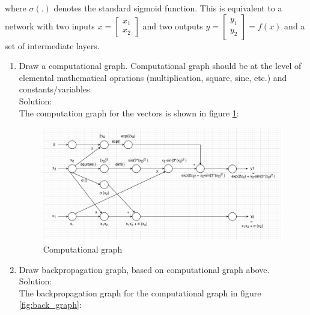 \documentclass[12pt]{article}
\begin{document}
\noindent where $\sigma(.)$ denotes the standard sigmoid function. This is equivalent to a network with two inputs 
$x = 
\begin{bmatrix}
x_1\\
x_2
\end{bmatrix}
$
and two outputs 
$y = 
\begin{bmatrix}
y_1\\
y_2
\end{bmatrix} = f(x)
$
and a set of intermediate layers.
\begin{enumerate}[label=(\roman*)]

\newpage
\item Draw a computational graph. Computational graph should be at the level of elemental mathematical oprations (multiplication, square, sine, etc.) and constants/variables.\\


Solution:\\
The computation graph for the vectors is shown in figure \ref{fig:comp_graph}:

\begin{figure}[h!]
    \centering
    \includegraphics[width = 17 cm, scale=0.5]{images/Screenshot_2021-04-06 A2_571T drawio - diagrams net.png}
    \caption{Computational graph}
    \label{fig:comp_graph}
\end{figure}


\newpage

\item Draw backpropagation graph, based on computational graph above.\\

Solution:\\
The backpropagation graph for the computational graph in figure \ref{fig:back_graph}:


\end{enumerate}
\end{document}
